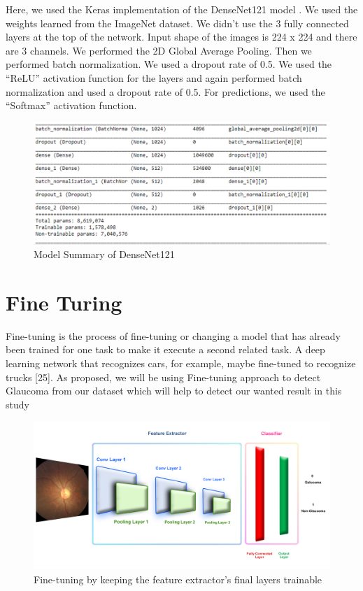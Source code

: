 \vspace{5mm}
\noindent Here, we used the Keras implementation of the DenseNet121 model . We used the weights learned from the ImageNet dataset. We didn’t use the 3 fully connected layers at the top of the network. Input shape of the images is 224 x 224 and there are 3 channels. We performed  the 2D Global Average Pooling. Then we performed batch normalization. We used a dropout rate of 0.5. We used the “ReLU” activation function for the layers and again performed batch normalization and used a dropout rate of 0.5. For predictions, we used the “Softmax” activation function.

\vspace{5mm}
\begin{figure}[hbt!]
\centering
\includegraphics[scale=0.5]{images/fig-15.png}
\caption{Model Summary of DenseNet121}
\label{fig:x Model Summary of DenseNet121}
\end{figure}

\section{Fine Turing}
Fine-tuning is the process of fine-tuning or changing a model that has already been trained for one task to make it execute a second related task. A deep learning network that recognizes cars, for example, maybe fine-tuned to recognize trucks [25]. As proposed, we will be using Fine-tuning approach to detect Glaucoma from our dataset which will help to detect our wanted result in this study

\vspace{5mm}
\begin{figure}[hbt!]
\centering
\includegraphics[scale=0.4]{images/Fine-tuning by keeping the feature extractor_s final layers trainable.png}
\caption{Fine-tuning by keeping the feature extractor's final layers trainable}
\label{fig:x Fine-tuning by keeping the feature extractor's final layers trainable}
\end{figure}

